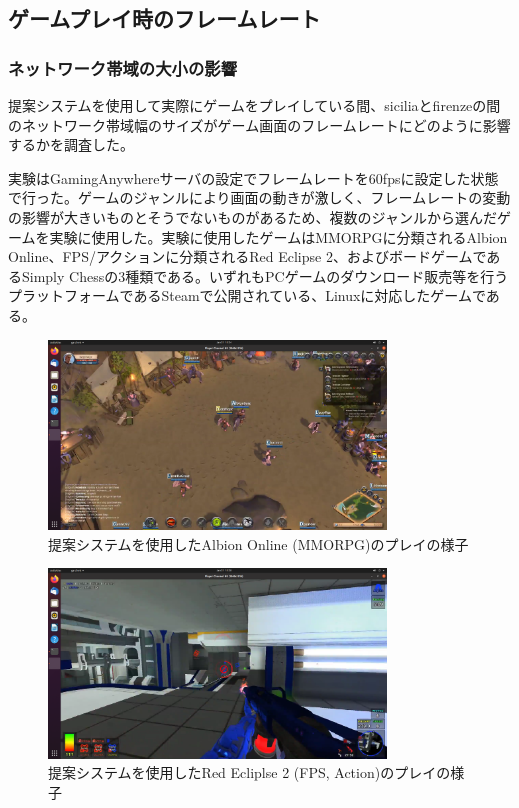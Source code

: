 \subsection{ゲームプレイ時のフレームレート}

\subsubsection{ネットワーク帯域の大小の影響}
提案システムを使用して実際にゲームをプレイしている間、siciliaとfirenzeの間のネットワーク帯域幅のサイズがゲーム画面のフレームレートにどのように影響するかを調査した。

実験はGamingAnywhereサーバの設定でフレームレートを60fpsに設定した状態で行った。ゲームのジャンルにより画面の動きが激しく、フレームレートの変動の影響が大きいものとそうでないものがあるため、複数のジャンルから選んだゲームを実験に使用した。実験に使用したゲームはMMORPGに分類されるAlbion Online\cite{albiononline}、FPS/アクションに分類されるRed Eclipse 2\cite{redeclipse}、およびボードゲームであるSimply Chess\cite{simplychess}の3種類である。いずれもPCゲームのダウンロード販売等を行うプラットフォームであるSteam\cite{steam}で公開されている、Linuxに対応したゲームである。

\begin{figure}[t]
    \centering
    \includegraphics[width=0.8\textwidth,keepaspectratio,clip]{img/screen_mmo.pdf}
    \caption{提案システムを使用したAlbion Online (MMORPG)のプレイの様子}
    \label{fig:screen_mmo}
\end{figure}

\begin{figure}[t]
    \centering
    \includegraphics[width=0.8\textwidth,keepaspectratio,clip]{img/screen_fps.pdf}
    \caption{提案システムを使用したRed Ecliplse 2 (FPS, Action)のプレイの様子}
    \label{fig:screen_fps}
\end{figure}


